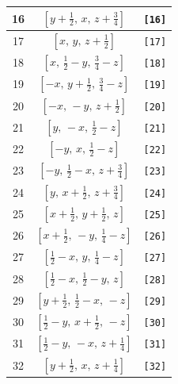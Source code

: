 \documentclass[fleqn,8pt]{jsarticle}
\begin{document}
\begin{longtable}{ccc}
16 & $\left[ y + \frac{1}{2},\, x,\, z + \frac{3}{4} \right]$ & {\tt [16]} \\ \hline
17 & $\left[ x,\, y,\, z + \frac{1}{2} \right]$ & {\tt [17]} \\ \hline
18 & $\left[ x,\, \frac{1}{2} - y,\, \frac{3}{4} - z \right]$ & {\tt [18]} \\ \hline
19 & $\left[ - x,\, y + \frac{1}{2},\, \frac{3}{4} - z \right]$ & {\tt [19]} \\ \hline
20 & $\left[ - x,\, - y,\, z + \frac{1}{2} \right]$ & {\tt [20]} \\ \hline
21 & $\left[ y,\, - x,\, \frac{1}{2} - z \right]$ & {\tt [21]} \\ \hline
22 & $\left[ - y,\, x,\, \frac{1}{2} - z \right]$ & {\tt [22]} \\ \hline
23 & $\left[ - y,\, \frac{1}{2} - x,\, z + \frac{3}{4} \right]$ & {\tt [23]} \\ \hline
24 & $\left[ y,\, x + \frac{1}{2},\, z + \frac{3}{4} \right]$ & {\tt [24]} \\ \hline
25 & $\left[ x + \frac{1}{2},\, y + \frac{1}{2},\, z \right]$ & {\tt [25]} \\ \hline
26 & $\left[ x + \frac{1}{2},\, - y,\, \frac{1}{4} - z \right]$ & {\tt [26]} \\ \hline
27 & $\left[ \frac{1}{2} - x,\, y,\, \frac{1}{4} - z \right]$ & {\tt [27]} \\ \hline
28 & $\left[ \frac{1}{2} - x,\, \frac{1}{2} - y,\, z \right]$ & {\tt [28]} \\ \hline
29 & $\left[ y + \frac{1}{2},\, \frac{1}{2} - x,\, - z \right]$ & {\tt [29]} \\ \hline
30 & $\left[ \frac{1}{2} - y,\, x + \frac{1}{2},\, - z \right]$ & {\tt [30]} \\ \hline
31 & $\left[ \frac{1}{2} - y,\, - x,\, z + \frac{1}{4} \right]$ & {\tt [31]} \\ \hline
32 & $\left[ y + \frac{1}{2},\, x,\, z + \frac{1}{4} \right]$ & {\tt [32]} \\
\end{longtable}
\end{document}
